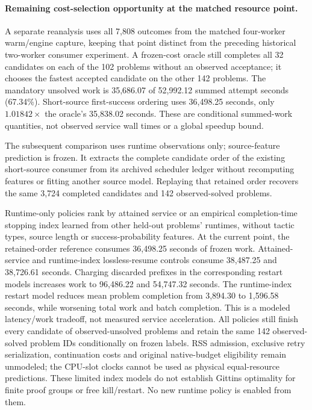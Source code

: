 \documentclass[10pt,twocolumn]{article}
\begin{document}
\paragraph{Remaining cost-selection opportunity at the matched resource point.}
A separate reanalysis uses all 7,808 outcomes from the matched four-worker
warm/engine capture, keeping that point distinct from the preceding historical
two-worker consumer experiment. A frozen-cost oracle still completes all 32
candidates on each of the 102 problems without an observed acceptance; it
chooses the fastest accepted candidate on the other 142 problems.
The mandatory unsolved work is 35,686.07 of 52,992.12 summed attempt seconds
(67.34\%). Short-source first-success ordering uses 36,498.25 seconds,
only $1.01842\times$ the oracle's 35,838.02 seconds.
These are conditional summed-work quantities, not observed service wall times
or a global speedup bound.

The subsequent comparison uses runtime observations only; source-feature
prediction is frozen. It extracts the complete candidate order of the existing
short-source consumer from its archived scheduler ledger without recomputing
features or fitting another source model. Replaying that retained order
recovers the same 3,724 completed candidates and 142 observed-solved problems.

Runtime-only policies rank by attained service or an empirical completion-time
stopping index learned from other held-out problems' runtimes, without tactic
types, source length or success-probability features. At the current point,
the retained-order reference consumes 36,498.25 seconds of frozen work.
Attained-service and runtime-index lossless-resume controls consume 38,487.25
and 38,726.61 seconds. Charging discarded prefixes in the corresponding restart
models increases work to 96,486.22 and 54,747.32 seconds.
The runtime-index restart model reduces mean problem completion from
3,894.30 to 1,596.58 seconds, while worsening total work and batch completion.
This is a modeled latency/work tradeoff, not measured service acceleration.
All policies still finish every candidate of observed-unsolved problems and
retain the same 142 observed-solved problem IDs conditionally on frozen labels.
RSS admission, exclusive retry serialization, continuation costs and original
native-budget eligibility remain unmodeled; the CPU-slot clocks cannot be used
as physical equal-resource predictions. These limited index models do not
establish Gittins optimality for finite proof groups or free kill/restart.
No new runtime policy is enabled from them.
\end{document}
